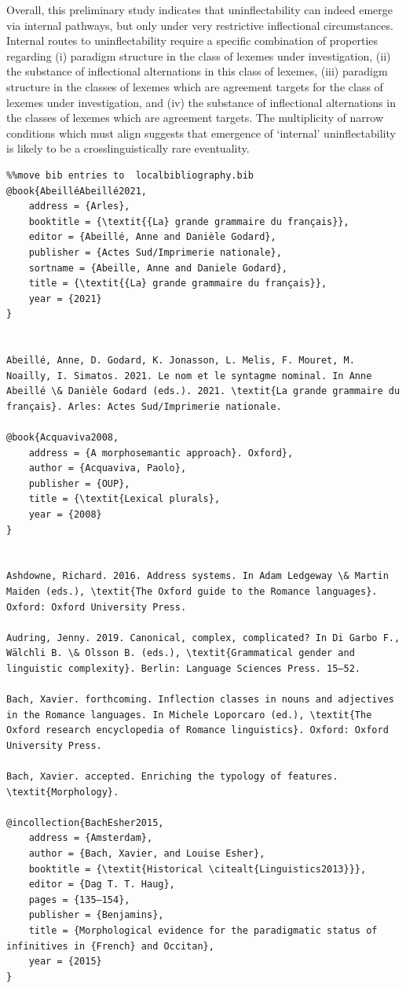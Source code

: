 \documentclass[output=paper]{langscibook}
\begin{document}
Overall, this preliminary study indicates that uninflectability can indeed emerge via internal pathways, but only under very restrictive inflectional circumstances. Internal routes to uninflectability require a specific combination of properties regarding (i) paradigm structure in the class of lexemes under investigation, (ii) the substance of inflectional alternations in this class of lexemes, (iii) paradigm structure in the classes of lexemes which are agreement targets for the class of lexemes under investigation, and (iv) the substance of inflectional alternations in the classes of lexemes which are agreement targets. The multiplicity of narrow conditions which must align suggests that emergence of ‘internal’ uninflectability is likely to be a crosslinguistically rare eventuality.
\begin{verbatim}%%move bib entries to  localbibliography.bib
@book{AbeilléAbeillé2021,
	address = {Arles},
	booktitle = {\textit{{La} grande grammaire du français}},
	editor = {Abeillé, Anne and Danièle Godard},
	publisher = {Actes Sud/Imprimerie nationale},
	sortname = {Abeille, Anne and Daniele Godard},
	title = {\textit{{La} grande grammaire du français}},
	year = {2021}
}


Abeillé, Anne, D. Godard, K. Jonasson, L. Melis, F. Mouret, M. Noailly, I. Simatos. 2021. Le nom et le syntagme nominal. In Anne Abeillé \& Danièle Godard (eds.). 2021. \textit{La grande grammaire du français}. Arles: Actes Sud/Imprimerie nationale.

@book{Acquaviva2008,
	address = {A morphosemantic approach}. Oxford},
	author = {Acquaviva, Paolo},
	publisher = {OUP},
	title = {\textit{Lexical plurals},
	year = {2008}
}


Ashdowne, Richard. 2016. Address systems. In Adam Ledgeway \& Martin Maiden (eds.), \textit{The Oxford guide to the Romance languages}. Oxford: Oxford University Press.

Audring, Jenny. 2019. Canonical, complex, complicated? In Di Garbo F., Wälchli B. \& Olsson B. (eds.), \textit{Grammatical gender and linguistic complexity}. Berlin: Language Sciences Press. 15–52.

Bach, Xavier. forthcoming. Inflection classes in nouns and adjectives in the Romance languages. In Michele Loporcaro (ed.), \textit{The Oxford research encyclopedia of Romance linguistics}. Oxford: Oxford University Press.

Bach, Xavier. accepted. Enriching the typology of features. \textit{Morphology}.

@incollection{BachEsher2015,
	address = {Amsterdam},
	author = {Bach, Xavier, and Louise Esher},
	booktitle = {\textit{Historical \citealt{Linguistics2013}}},
	editor = {Dag T. T. Haug},
	pages = {135–154},
	publisher = {Benjamins},
	title = {Morphological evidence for the paradigmatic status of infinitives in {French} and Occitan},
	year = {2015}
}



\end{verbatim}
\end{document}
